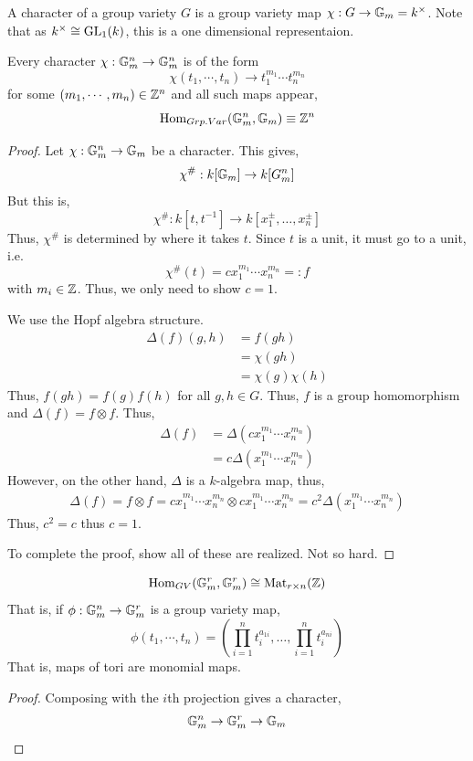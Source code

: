 \documentclass[12pt]{amsart}
\begin{document}
\begin{definition}
    A character of a group variety $G$ is a group variety map $\chi: G \to \mathbb G_m = k^\times$. Note that as $k^\times \cong \operatorname{GL}_1(k)$, this is a one dimensional representaion. 
\end{definition}

\begin{lemma}
    Every character $\chi: \mathbb G_m^n \to \mathbb G_m^n$ is of the form 
    \[ \chi(t_1, \cdots, t_n) \to t_1^{m_1}\cdots t_n^{m_n} \]
    for some $(m_1, \cdots, m_n) \in \mathbb Z^n$ and all such maps appear, 
    \[ \operatorname{Hom}_{Grp. Var}(\mathbb G_m^n, \mathbb G_m) \equiv \mathbb Z^n \] 
\end{lemma}

\begin{proof}
    Let $\chi: \mathbb G_m^n \to \mathbb G_m$ be a character. This gives, 
    \[ \chi^\#: k[\mathbb G_m] \to k[G_m^n]\] 
    But this is, 
    \[ \chi^\#: k[t, t^{-1}] \to k[x_1^\pm, \ldots, x_n^\pm]\]
    Thus, $\chi^\#$ is determined by where it takes $t$. Since $t$ is a unit, it must go to a unit, i.e.
    \[ \chi^\#(t) = cx_1^{m_1}\cdots x_n^{m_n} =: f\]
    with $m_i \in \mathbb Z$. Thus, we only need to show $c = 1$. 
    
    We use the Hopf algebra structure. 
    \begin{align*}
        \Delta(f)(g, h) &= f(gh) \\
        &= \chi(gh) \\
        &= \chi(g)\chi(h) 
    \end{align*}
    Thus, $f(gh) = f(g)f(h)$ for all $g, h \in G$. Thus, $f$ is a group homomorphism and $\Delta(f) = f \otimes f$. Thus,
    \begin{align*}
        \Delta(f) &= \Delta(cx_1^{m_1}\cdots x_n^{m_n}) \\
        &= c\Delta(x_1^{m_1}\cdots x_n^{m_n})
    \end{align*}
    However, on the other hand, $\Delta$ is a $k$-algebra map, thus, 
    \begin{align*}
        \Delta(f) = f \otimes f = cx_1^{m_1}\cdots x_n^{m_n} \otimes cx_1^{m_1}\cdots x_n^{m_n} = c^2\Delta(x_1^{m_1}\cdots x_n^{m_n})
    \end{align*}
    Thus, $c^2 = c$ thus $c =1$.  

    To complete the proof, show all of these are realized. Not so hard. 
\end{proof}

\begin{corollary}
    \[ \operatorname{Hom}_{GV}(\mathbb G_m^r, \mathbb G_m^r) \cong \operatorname{Mat}_{r\times n}(\mathbb Z)\]
    That is, if $\phi: \mathbb G_m^n \to \mathbb G_m^r$ is a group variety map,
    \[ \phi(t_1, \cdots, t_n) = \left(\prod_{i=1}^n t_i^{a_{1i}}, \ldots, \prod_{i=1}^n t_i^{a_{ni}}\right)\]
    That is, maps of tori are monomial maps. 
\end{corollary}
\begin{proof}
    Composing with the $i$th projection gives a character, 
    \[ \mathbb G_m^n \to \mathbb G_m^r \to \mathbb G_m\]
\end{proof}
\end{document}
